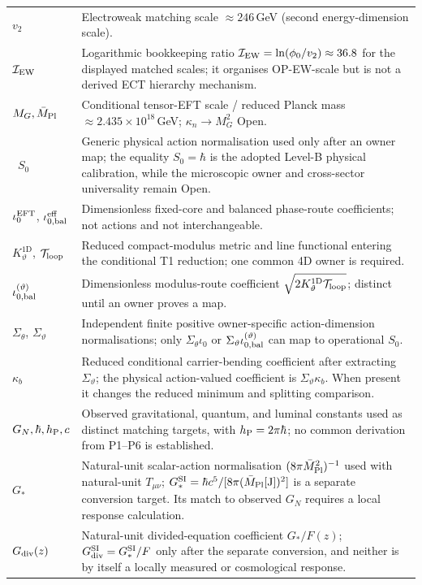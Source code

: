 \documentclass[11pt,a4paper]{article}
\begin{document}
\begin{longtable}{@{}p{2.6cm}p{12.6cm}@{}}
$v_2$ & Electroweak matching scale $\approx 246$\,GeV (second energy-dimension scale). \\
$\mathcal{I}_{\rm EW}$ & Logarithmic bookkeeping ratio $\mathcal{I}_{\rm EW}=\ln(\phi_0/v_2)\approx36.8$ for the displayed matched scales; it organises OP-EW-scale but is not a derived ECT hierarchy mechanism. \\
$M_G,\bar M_{\rm Pl}$ & Conditional tensor-EFT scale / reduced Planck mass $\approx 2.435\times10^{18}$\,GeV; $\kappa_n\to M_G^2$ Open. \\\
$S_0$ & Generic physical action normalisation used only after an owner map;
the equality $S_0=\hbar$ is the adopted Level-B physical calibration, while
the microscopic owner and cross-sector universality remain Open. \\
$\iota_0^{\rm EFT}$, $\iota_{0,\rm bal}^{\rm eff}$ & Dimensionless fixed-core and balanced phase-route coefficients; not actions and not interchangeable. \\
$K_\vartheta^{1\mathrm D}$, $\mathcal T_{\rm loop}$ & Reduced compact-modulus metric and line functional entering the conditional T1 reduction; one common 4D owner is required. \\
$\iota_{0,\rm bal}^{(\vartheta)}$ & Dimensionless modulus-route coefficient $\sqrt{2K_\vartheta^{1\mathrm D}\mathcal T_{\rm loop}}$; distinct until an owner proves a map. \\
$\Sigma_\theta$, $\Sigma_\vartheta$ & Independent finite positive owner-specific action-dimension normalisations; only $\Sigma_\theta\iota_0$ or $\Sigma_\vartheta\iota_{0,\rm bal}^{(\vartheta)}$ can map to operational $S_0$. \\
$\kappa_b$ & Reduced conditional carrier-bending coefficient after extracting $\Sigma_\vartheta$; the physical action-valued coefficient is $\Sigma_\vartheta\kappa_b$.  When present it changes the reduced minimum and splitting comparison. \\
$G_N,\hbar,h_{\rm P},c$ & Observed gravitational, quantum, and luminal constants used as distinct matching targets, with $h_{\rm P}=2\pi\hbar$; no common derivation from P1--P6 is established. \\
$G_*$ & Natural-unit scalar-action normalisation $(8\pi\bar M_{\rm Pl}^2)^{-1}$ used with natural-unit $T_{\mu\nu}$; $G_*^{\rm SI}=\hbar c^5/[8\pi(\bar M_{\rm Pl}[\mathrm J])^2]$ is a separate conversion target.  Its match to observed $G_N$ requires a local response calculation. \\
$G_{\rm div}(z)$ & Natural-unit divided-equation coefficient $G_*/F(z)$; $G_{\rm div}^{\rm SI}=G_*^{\rm SI}/F$ only after the separate conversion, and neither is by itself a locally measured or cosmological response. \\

\end{longtable}
\end{document}

